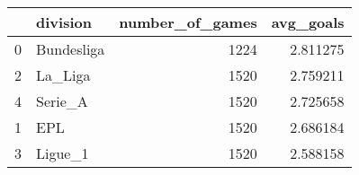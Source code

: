 \begin{tabular}{llrr}
\toprule
{} &    division &  number\_of\_games &  avg\_goals \\
\midrule
0 &  Bundesliga &             1224 &   2.811275 \\
2 &     La\_Liga &             1520 &   2.759211 \\
4 &     Serie\_A &             1520 &   2.725658 \\
1 &         EPL &             1520 &   2.686184 \\
3 &     Ligue\_1 &             1520 &   2.588158 \\
\bottomrule
\end{tabular}
